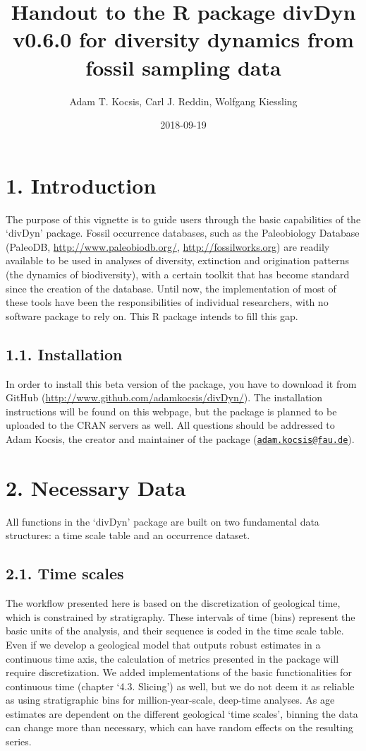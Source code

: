 \documentclass[]{article}
\title{Handout to the R package divDyn v0.6.0 for diversity dynamics from
fossil sampling data}
\author{Adam T. Kocsis, Carl J. Reddin, Wolfgang Kiessling}
\date{2018-09-19}
\begin{document}
\maketitle

\section{1. Introduction}\label{introduction}

The purpose of this vignette is to guide users through the basic
capabilities of the `divDyn' package. Fossil occurrence databases, such
as the Paleobiology Database (PaleoDB, \url{http://www.paleobiodb.org/},
\url{http://fossilworks.org}) are readily available to be used in
analyses of diversity, extinction and origination patterns (the dynamics
of biodiversity), with a certain toolkit that has become standard since
the creation of the database. Until now, the implementation of most of
these tools have been the responsibilities of individual researchers,
with no software package to rely on. This R package intends to fill this
gap.

\subsection{1.1. Installation}\label{installation}

In order to install this beta version of the package, you have to
download it from GitHub
(\url{http://www.github.com/adamkocsis/divDyn/}). The installation
instructions will be found on this webpage, but the package is planned
to be uploaded to the CRAN servers as well. All questions should be
addressed to Adam Kocsis, the creator and maintainer of the package
(\href{mailto:adam.kocsis@fau.de}{\nolinkurl{adam.kocsis@fau.de}}).

\section{2. Necessary Data}\label{necessary-data}

All functions in the `divDyn' package are built on two fundamental data
structures: a time scale table and an occurrence dataset.

\subsection{2.1. Time scales}\label{time-scales}

The workflow presented here is based on the discretization of geological
time, which is constrained by stratigraphy. These intervals of time
(bins) represent the basic units of the analysis, and their sequence is
coded in the time scale table. Even if we develop a geological model
that outputs robust estimates in a continuous time axis, the calculation
of metrics presented in the package will require discretization. We
added implementations of the basic functionalities for continuous time
(chapter `4.3. Slicing') as well, but we do not deem it as reliable as
using stratigraphic bins for million-year-scale, deep-time analyses. As
age estimates are dependent on the different geological `time scales',
binning the data can change more than necessary, which can have random
effects on the resulting series.
\end{document}
